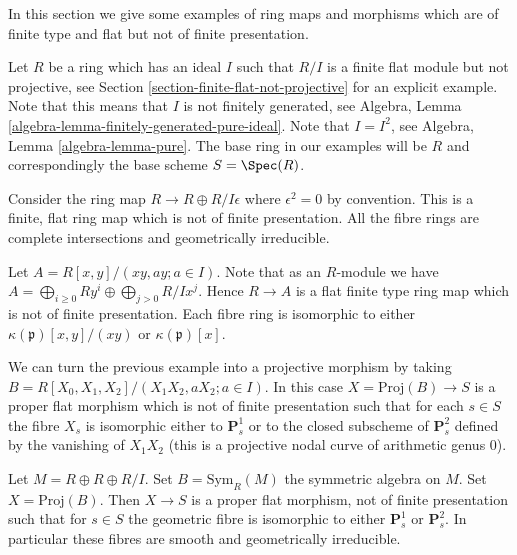 \noindent
In this section we give some examples of ring maps and morphisms
which are of finite type and flat but not of finite presentation.

\medskip\noindent
Let $R$ be a ring which has an ideal $I$ such that $R/I$ is a finite
flat module but not projective, see
Section \ref{section-finite-flat-not-projective}
for an explicit example. Note that this means that $I$ is not
finitely generated, see
Algebra, Lemma \ref{algebra-lemma-finitely-generated-pure-ideal}.
Note that $I = I^2$, see
Algebra, Lemma \ref{algebra-lemma-pure}.
The base ring in our examples will be
$R$ and correspondingly the base scheme $S = \Spec(R)$.

\medskip\noindent
Consider the ring map $R \to R \oplus R/I\epsilon$ where
$\epsilon^2 = 0$ by convention. This is a finite, flat
ring map which is not of finite presentation. All the fibre rings
are complete intersections and geometrically irreducible.

\medskip\noindent
Let $A = R[x, y]/(xy, ay; a \in I)$. Note that as an $R$-module
we have $A = \bigoplus_{i \geq 0} Ry^i \oplus \bigoplus_{j > 0} R/Ix^j$.
Hence $R \to A$ is a flat finite type ring map which is not of finite
presentation. Each fibre ring
is isomorphic to either $\kappa(\mathfrak p)[x, y]/(xy)$
or $\kappa(\mathfrak p)[x]$.

\medskip\noindent
We can turn the previous example into a projective morphism by
taking $B = R[X_0, X_1, X_2]/(X_1X_2, aX_2; a \in I)$.
In this case $X = \text{Proj}(B) \to S$ is a proper flat morphism
which is not of finite presentation such that for each $s \in S$
the fibre $X_s$ is isomorphic either to $\mathbf{P}^1_s$ or to
the closed subscheme of $\mathbf{P}^2_s$ defined by the vanishing of
$X_1X_2$ (this is a projective nodal curve of arithmetic genus $0$).

\medskip\noindent
Let $M = R \oplus R \oplus R/I$. Set $B = \text{Sym}_R(M)$ the
symmetric algebra on $M$. Set $X = \text{Proj}(B)$.
Then $X \to S$ is a proper flat morphism, not of finite presentation
such that for $s \in S$ the geometric fibre is isomorphic to either
$\mathbf{P}^1_s$ or $\mathbf{P}^2_s$. In particular these fibres are
smooth and geometrically irreducible.

